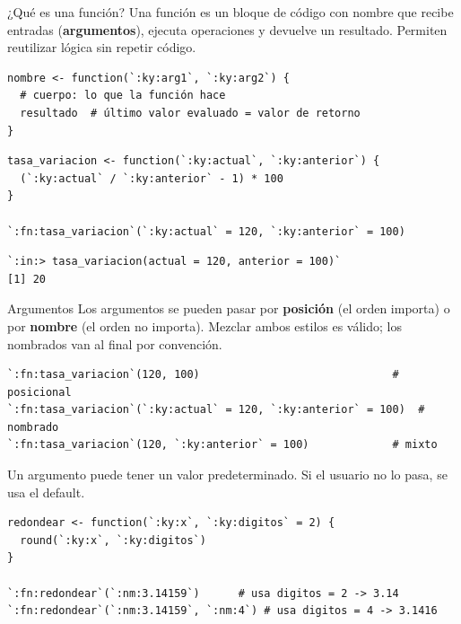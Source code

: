 \documentclass[8pt]{beamer}
\begin{document}
	\subtitle{Cheatsheet de funciones y funciones anónimas}

	\begin{frame}[plain]
		\maketitle
	\end{frame}


	\begin{frame}[fragile]{¿Qué es una función?}
		Una función es un bloque de código con nombre que recibe entradas (\textbf{argumentos}), ejecuta operaciones y devuelve un resultado. Permiten reutilizar lógica sin repetir código.

\begin{lstlisting}[style=RScript]
nombre <- function(`:ky:arg1`, `:ky:arg2`) {
  # cuerpo: lo que la función hace
  resultado  # último valor evaluado = valor de retorno
}
\end{lstlisting}

\begin{lstlisting}[style=RScript]
tasa_variacion <- function(`:ky:actual`, `:ky:anterior`) {
  (`:ky:actual` / `:ky:anterior` - 1) * 100
}

`:fn:tasa_variacion`(`:ky:actual` = 120, `:ky:anterior` = 100)
\end{lstlisting}
\begin{lstlisting}[style=RConsole]
`:in:> tasa_variacion(actual = 120, anterior = 100)`
[1] 20
\end{lstlisting}
	\end{frame}


	\begin{frame}[fragile]{Argumentos}
		Los argumentos se pueden pasar por \textbf{posición} (el orden importa) o por \textbf{nombre} (el orden no importa). Mezclar ambos estilos es válido; los nombrados van al final por convención.
\begin{lstlisting}[style=RScript]
`:fn:tasa_variacion`(120, 100)                              # posicional
`:fn:tasa_variacion`(`:ky:actual` = 120, `:ky:anterior` = 100)  # nombrado
`:fn:tasa_variacion`(120, `:ky:anterior` = 100)             # mixto
\end{lstlisting}

		Un argumento puede tener un valor predeterminado. Si el usuario no lo pasa, se usa el default.
\begin{lstlisting}[style=RScript]
redondear <- function(`:ky:x`, `:ky:digitos` = 2) {
  round(`:ky:x`, `:ky:digitos`)
}

`:fn:redondear`(`:nm:3.14159`)   	# usa digitos = 2 -> 3.14
`:fn:redondear`(`:nm:3.14159`, `:nm:4`) # usa digitos = 4 -> 3.1416
\end{lstlisting}
	\end{frame}
	
\end{document}
